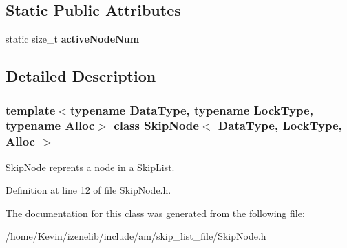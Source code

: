 \subsection*{Static Public Attributes}
\begin{CompactItemize}
\item 
\hypertarget{classSkipNode_8f59f7b226e4c08f3f6e26c6a2f3edb1}{
static size\_\-t \textbf{activeNodeNum}}
\label{classSkipNode_8f59f7b226e4c08f3f6e26c6a2f3edb1}

\end{CompactItemize}


\subsection{Detailed Description}
\subsubsection*{template$<$typename DataType, typename LockType, typename Alloc$>$ class SkipNode$<$ DataType, LockType, Alloc $>$}

\hyperlink{classSkipNode}{SkipNode} reprents a node in a SkipList. 

Definition at line 12 of file SkipNode.h.

The documentation for this class was generated from the following file:\begin{CompactItemize}
\item 
/home/Kevin/izenelib/include/am/skip\_\-list\_\-file/SkipNode.h\end{CompactItemize}
